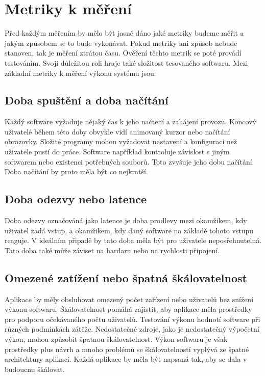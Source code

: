 \section*{Metriky k měření}

Před každým měřením by mělo být jasně dáno jaké metriky budeme měřit a jakým způsobem se to bude vykonávat. Pokud metriky ani způsob nebude
stanoven, tak je měření ztrátou času. Ověření těchto metrik se poté provádí testováním. Svoji důležitou roli hraje také složitost tesovaného
softwaru. Mezi základní metriky k měření výkonu systému jsou:

\subsection*{Doba spuštění a doba načítání}

Každý software vyžaduje nějaký čas k jeho načtení a zahájení provozu. Koncový uživatelé během této doby obvykle vidí animovaný kurzor nebo
načítání obrazovky. Složité programy mohou vyžadovat nastavení a konfiguraci než uživatele pustí do práce. Software například kontroluje
závislost s jiným softwarem nebo existenci potřebných souborů. Toto zvyšuje jeho dobu načítání. Doba načítání by proto měla být co nejkratší.

\subsection*{Doba odezvy nebo latence}

Doba odezvy označováná jako latence je doba prodlevy mezi okamžikem, kdy uživatel zadá vstup, a okamžikem, kdy daný software na základě tohoto vstupu reaguje.
V ideálním připadě by tato doba měla být pro uživatele neposřehnutelná. Tato doba také může záviset na hardaru nebo na rychlosti připojení.

\subsection*{Omezené zatížení nebo špatná škálovatelnost}

Aplikace by měly obsluhovat omezený počet zařízení nebo uživatelů bez snížení výkonu softwaru. Škálovatelnost pomáhá zajistit, aby aplikace měla prostředky pro podporu očekávaného počtu uživatelů.
Testování výkonu hodnotí software při různých podmínkách zátěže. Nedostatečné zdroje, jako je nedostatečný výpočetní výkon, mohou způsobit špatnou škálovatelnost.
Výkon softwaru je však prostředky plus návrh a mnoho problémů se škálovatelností vyplývá ze špatné architektury aplikací. Každá aplikace by měla být napsaná tak, aby se dala v budoucnu škálovat.

